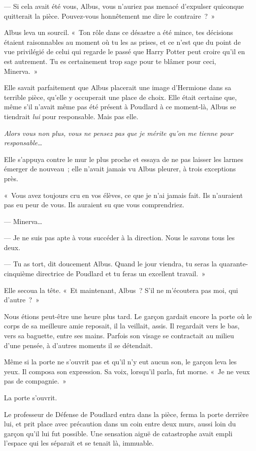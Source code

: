 --- Si cela avait été vous, Albus, vous n'auriez pas menacé d'expulser quiconque quitterait la pièce. Pouvez-vous honnêtement me dire le contraire~?~»

Albus leva un sourcil. «~Ton rôle dans ce désastre a été mince, tes décisions étaient raisonnables au moment où tu les as prises, et ce n'est que du point de vue privilégié de celui qui regarde le passé que Harry Potter peut croire qu'il en est autrement. Tu es certainement trop sage pour te blâmer pour ceci, Minerva.~»

Elle savait parfaitement que Albus placerait une image d'Hermione dans sa terrible pièce, qu'elle y occuperait une place de choix. Elle était certaine que, même s'il n'avait même pas été présent à Poudlard à ce moment-là, Albus se tiendrait \emph{lui} pour responsable. Mais pas elle.

\emph{Alors vous non plus, vous ne pensez pas que je mérite qu'on me tienne pour responsable…}

Elle s'appuya contre le mur le plus proche et essaya de ne pas laisser les larmes émerger de nouveau~; elle n'avait jamais vu Albus pleurer, à trois exceptions près.

«~Vous avez toujours cru en vos élèves, ce que je n'ai jamais fait. Ils n'auraient pas eu peur de vous. Ils auraient su que vous comprendriez.

--- Minerva…

--- Je ne suis pas apte à vous succéder à la direction. Nous le savons tous les deux.

--- Tu as tort, dit doucement Albus. Quand le jour viendra, tu seras la quarante-cinquième directrice de Poudlard et tu feras un excellent travail.~»

Elle secoua la tête. «~Et maintenant, Albus~? S'il ne m'écoutera pas moi, qui d'autre~?~»

\later

Nous étions peut-être une heure plus tard. Le garçon gardait encore la porte où le corps de sa meilleure amie reposait, il la veillait, assis. Il regardait vers le bas, vers sa baguette, entre ses mains. Parfois son visage se contractait au milieu d'une pensée, à d'autres moments il se détendait.

Même si la porte ne s'ouvrit pas et qu'il n'y eut aucun son, le garçon leva les yeux. Il composa son expression. Sa voix, lorsqu'il parla, fut morne. «~Je ne veux pas de compagnie.~»

La porte s'ouvrit.

Le professeur de Défense de Poudlard entra dans la pièce, ferma la porte derrière lui, et prit place avec précaution dans un coin entre deux murs, aussi loin du garçon qu'il lui fut possible. Une sensation aiguë de catastrophe avait empli l'espace qui les séparait et se tenait là, immuable.

